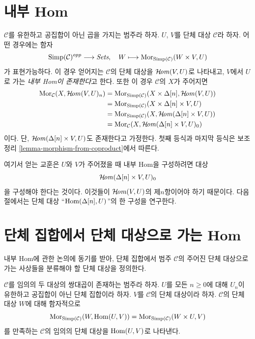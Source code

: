 \section{내부 Hom}
\label{section-internal-hom}

\noindent
$\mathcal{C}$를 유한하고 공집합이 아닌 곱을 가지는 범주라 하자.
$U$, $V$를 단체 대상 $\mathcal{C}$라 하자.
어떤 경우에는 함자
$$
\text{Simp}(\mathcal{C})^{opp} \longrightarrow \textit{Sets}, \quad
W \longmapsto \mathop{\mathrm{Mor}}\nolimits_{\text{Simp}(\mathcal{C})}(W \times V, U)
$$
가 표현가능하다. 이 경우 얻어지는 $\mathcal{C}$의 단체 대상을
$\mathop{\mathcal{H}\!\mathit{om}}\nolimits(V, U)$로 나타내고, {$V$에서 $U$로 가는 {\it 내부 Hom이
존재한다}}고 한다. 또한 이 경우 $\mathcal{C}$의 $X$가 주어지면
\begin{align*}
\mathop{\mathrm{Mor}}\nolimits_\mathcal{C}(X, \mathop{\mathcal{H}\!\mathit{om}}\nolimits(V, U)_n)
& =
\mathop{\mathrm{Mor}}\nolimits_{\text{Simp}(\mathcal{C})}(X \times \Delta[n], \mathop{\mathcal{H}\!\mathit{om}}\nolimits(V, U)) \\
& =
\mathop{\mathrm{Mor}}\nolimits_{\text{Simp}(\mathcal{C})}(X \times \Delta[n]\times V, U) \\
& =
\mathop{\mathrm{Mor}}\nolimits_{\text{Simp}(\mathcal{C})}(X, \mathop{\mathcal{H}\!\mathit{om}}\nolimits(\Delta[n] \times V, U)) \\
& =
\mathop{\mathrm{Mor}}\nolimits_\mathcal{C}(X, \mathop{\mathcal{H}\!\mathit{om}}\nolimits(\Delta[n] \times V, U)_0)
\end{align*}
이다. 단, $\mathop{\mathcal{H}\!\mathit{om}}\nolimits(\Delta[n] \times V, U)$도 존재한다고 가정한다.
첫째 등식과 마지막 등식은 보조정리
\ref{lemma-morphism-from-coproduct}에서 따른다.

\medskip\noindent
여기서 얻는 교훈은 $U$와 $V$가 주어졌을 때 내부 Hom을 구성하려면 대상
$$
\mathop{\mathcal{H}\!\mathit{om}}\nolimits(\Delta[n] \times V, U)_0
$$
을 구성해야 한다는 것이다. 이것들이 $\mathop{\mathcal{H}\!\mathit{om}}\nolimits(V, U)$의 제$n$항이어야
하기 때문이다. 다음 절에서는 단체 대상
``$\mathop{\mathrm{Hom}}\nolimits(\Delta[n], U)$''의 한 구성을 연구한다.


\section{단체 집합에서 단체 대상으로 가는 Hom}
\label{section-hom-from-simplicial-sets}

\noindent
내부 Hom에 관한 논의에 동기를 받아, 단체 집합에서 범주
$\mathcal{C}$의 주어진 단체 대상으로 가는 사상들을 분류해야 할
단체 대상을 정의한다.

\begin{definition}
\label{definition-hom-from-simplicial-set}
$\mathcal{C}$를 임의의 두 대상의 쌍대곱이 존재하는 범주라 하자.
$U$를 모든 $n \geq 0$에 대해 $U_n$이 유한하고 공집합이 아닌
단체 집합이라 하자. $V$를 $\mathcal{C}$의 단체 대상이라 하자.
$\mathcal{C}$의 단체 대상 $W$에 대해 함자적으로
$$
\mathop{\mathrm{Mor}}\nolimits_{\text{Simp}(\mathcal{C})}(W, \mathop{\mathrm{Hom}}\nolimits(U, V))
=
\mathop{\mathrm{Mor}}\nolimits_{\text{Simp}(\mathcal{C})}(W \times U, V)
$$
를 만족하는 $\mathcal{C}$의 임의의 단체 대상을
{{\it $\mathop{\mathrm{Hom}}\nolimits(U, V)$}}로 나타낸다.
\end{definition}

